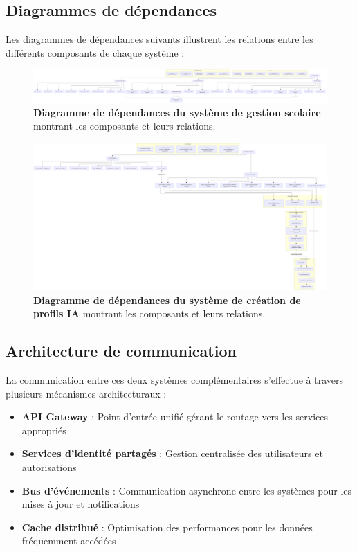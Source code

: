 \subsection{Diagrammes de dépendances}

Les diagrammes de dépendances suivants illustrent les relations entre les différents composants de chaque système :

\begin{figure}[H]
  \centering
  \includegraphics[width=1.0\textwidth,keepaspectratio]{pfe-pics/diagrames/project_1_dep_diagrame.png}
  \caption{\textbf{Diagramme de dépendances du système de gestion scolaire} montrant les composants et leurs relations.}
  \label{fig:school_dependencies}
\end{figure}

\begin{figure}[H]
  \centering
  \includegraphics[width=1.0\textwidth,keepaspectratio]{pfe-pics/diagrames/project_ai_profile_cretion_dep_diagrame.png}
  \caption{\textbf{Diagramme de dépendances du système de création de profils IA} montrant les composants et leurs relations.}
  \label{fig:ai_dependencies}
\end{figure}

\subsection{Architecture de communication}

La communication entre ces deux systèmes complémentaires s'effectue à travers plusieurs mécanismes architecturaux :

\begin{itemize}
  \item \textbf{API Gateway} : Point d'entrée unifié gérant le routage vers les services appropriés
  
  \item \textbf{Services d'identité partagés} : Gestion centralisée des utilisateurs et autorisations
  
  \item \textbf{Bus d'événements} : Communication asynchrone entre les systèmes pour les mises à jour et notifications
  
  \item \textbf{Cache distribué} : Optimisation des performances pour les données fréquemment accédées
\end{itemize}


